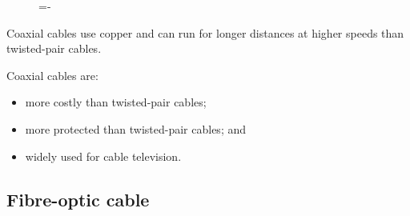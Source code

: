 \documentclass[a4paper]{systems-software}
\begin{document}
\begin{figure}[H]
	\lineskip=-\fboxrule
\end{figure}

Coaxial cables use copper and can run for longer distances at higher speeds than twisted-pair cables.

Coaxial cables are:
\begin{itemize}
	\item more costly than twisted-pair cables;
	\item more protected than twisted-pair cables; and
	\item widely used for cable television.
\end{itemize}


\subsection*{Fibre-optic cable}
\end{document}

